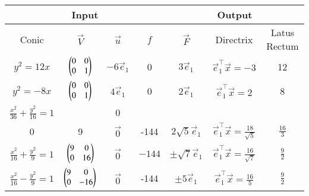 \begin{tabular}{|c|c|c|c|c|c|c|}
\hline
\multicolumn{4}{|c|}{Input} & \multicolumn{3}{|c|}{Output} \\
\hline
Conic & $\vec{V}$ & $\vec{u}$ & $f$ & $\vec{F}$ & Directrix & Latus Rectum\\
\hline
$y^2=12x$  & $\begin{pmatrix}0 & 0 \\ 0 & 1\end{pmatrix}$  & $-6\vec{e}_1$ & 0 & $3\vec{e}_1$ & $\vec{e}_1^{\top}\vec{x} = -3$ & 12 \\
\hline
$y^2=-8x$ &  $\begin{pmatrix}0 & 0 \\ 0 & 1\end{pmatrix}$& $4\vec{e}_1$ & 0 & $2\vec{e}_1$ & $\vec{e}_1^{\top}\vec{x} = 2$ & 8 \\
\hline
$\frac{x^2}{36}+\frac{y^2}{16}=1$ &\myvec{4&0\\0&9} & $\vec{0}$ &  -144& $2\sqrt{5}\vec{e}_1$ & $\vec{e}_1^{\top}\vec{x} = \frac{18}{\sqrt{5}}$ & $\frac{16}{3}$ \\
\hline
$\frac{x^2}{16}+\frac{y^2}{9}=1$ & $\begin{pmatrix}9&0\\0&16\end{pmatrix}$ &$\vec{0}$    &  $-144$& $\pm\sqrt{7}\vec{e}_1$ & $\vec{e}_1^{\top}\vec{x} = \frac{16}{\sqrt{7}}$ & $\frac{9}{2}$ \\
\hline
$\frac{x^2}{16}-\frac{y^2}{9} = 1$ & $\begin{pmatrix} 9 & 0 \\ 0 & -16\end{pmatrix}$    & $\vec{0}$ & -144  & $\pm 5\vec{e}_1$ & $\vec{e}_1^{\top}\vec{x} = \frac{16}{5}$ & $\frac{9}{2}$ \\
\hline
\end{tabular}
